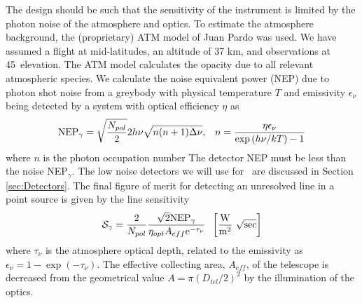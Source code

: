 The design should be such that the sensitivity of the instrument is
limited by the photon noise of the atmosphere and optics.
To estimate the atmosphere background, the (proprietary) ATM model of 
Juan Pardo was used.  We have assumed 
a flight at mid-latitudes, an altitude of 37 km, and 
observations at 45\arcdeg\ elevation.  The ATM model calculates the 
opacity due to all relevant atmospheric species. 
We calculate the noise equivalent power (NEP) due to photon shot noise 
from a greybody with physical temperature $T$ and emissivity 
$\epsilon_\nu$ being detected by a system with optical efficiency 
$\eta$ as 
\begin{eqnarray} 
\label{eq:nep_shot} 
{\rm NEP}_\gamma = \sqrt{\frac{N_{pol}}{2}}2 h \nu \sqrt{n(n+1) \Delta \nu} & , &  
n = \frac{\eta \epsilon_\nu}{\exp{(h \nu / k T)} - 1} 
\end{eqnarray} 
where $n$ is the photon occupation number  
The detector NEP must be less than the noise NEP$_\gamma$.  
The low noise detectors we will use for
\name\ are discussed in Section \ref{sec:Detectors}. The final figure
of merit for detecting an unresolved line in a point source is given
by the line sensitivity
\begin{equation} 
{\cal S}_\gamma = \frac{2}{N_{pol}}\frac{\sqrt{2} {\rm NEP}_\gamma} 
{\eta_{opt} A_{eff} \rm{e}^{-\tau_\nu}} \; \;
\left[{\rm \frac{W}{m^{2}}~\sqrt{sec}}\right]
\end{equation} 
where $\tau_\nu$ is the atmosphere optical depth, related to the
emissivity as $\epsilon_\nu = 1 - \exp{(-\tau_\nu)}$.  The effective
collecting area, $A_{eff}$, of the telescope is decreased from the
geometrical value $A = \pi (D_{tel}/2)^2$ by
the illumination of the optics.

